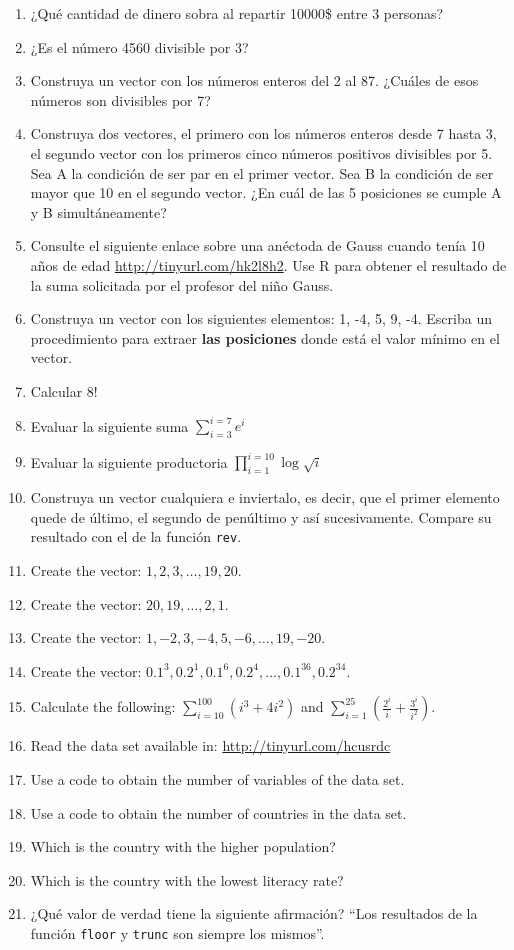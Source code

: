 \documentclass[10pt,]{krantz}
\providecommand{\tightlist}{%
  \setlength{\itemsep}{0pt}\setlength{\parskip}{0pt}}
\begin{document}
\begin{enumerate}
\def\labelenumi{\arabic{enumi}.}
\tightlist
\item
  ¿Qué cantidad de dinero sobra al repartir 10000\$ entre 3 personas?
\item
  ¿Es el número 4560 divisible por 3?
\item
  Construya un vector con los números enteros del 2 al 87. ¿Cuáles de
  esos números son divisibles por 7?
\item
  Construya dos vectores, el primero con los números enteros desde 7
  hasta 3, el segundo vector con los primeros cinco números positivos
  divisibles por 5. Sea A la condición de ser par en el primer vector.
  Sea B la condición de ser mayor que 10 en el segundo vector. ¿En cuál
  de las 5 posiciones se cumple A y B simultáneamente?
\item
  Consulte el siguiente enlace sobre una anéctoda de Gauss cuando tenía
  10 años de edad \url{http://tinyurl.com/hk2l8h2}. Use R para obtener
  el resultado de la suma solicitada por el profesor del niño Gauss.
\item
  Construya un vector con los siguientes elementos: 1, -4, 5, 9, -4.
  Escriba un procedimiento para extraer \textbf{las posiciones} donde
  está el valor mínimo en el vector.
\item
  Calcular \(8!\)
\item
  Evaluar la siguiente suma \(\sum_{i=3}^{i=7}e^i\)
\item
  Evaluar la siguiente productoria \(\prod_{i=1}^{i=10}\log\sqrt{i}\)
\item
  Construya un vector cualquiera e inviertalo, es decir, que el primer
  elemento quede de último, el segundo de penúltimo y así sucesivamente.
  Compare su resultado con el de la función \texttt{rev}.
\item
  Create the vector: \(1, 2, 3, \ldots, 19, 20\).
\item
  Create the vector: \(20, 19, \ldots , 2, 1\).
\item
  Create the vector: \(1, -2, 3, -4, 5, -6, \ldots, 19, -20\).
\item
  Create the vector:
  \(0.1^3, 0.2^1, 0.1^6, 0.2^4, . . . , 0.1^{36}, 0.2^{34}\).
\item
  Calculate the following: \(\sum_{i=10}^{100}(i^3+4i^2)\) and
  \(\sum_{i=1}^{25}\left( \frac{2^i}{i} + \frac{3^i}{i^2} \right)\).
\item
  Read the data set available in: \url{http://tinyurl.com/hcusrdc}
\item
  Use a code to obtain the number of variables of the data set.
\item
  Use a code to obtain the number of countries in the data set.
\item
  Which is the country with the higher population?
\item
  Which is the country with the lowest literacy rate?
\item
  ¿Qué valor de verdad tiene la siguiente afirmación? ``Los resultados
  de la función \texttt{floor} y \texttt{trunc} son siempre los
  mismos''.
\end{enumerate}
\end{document}
